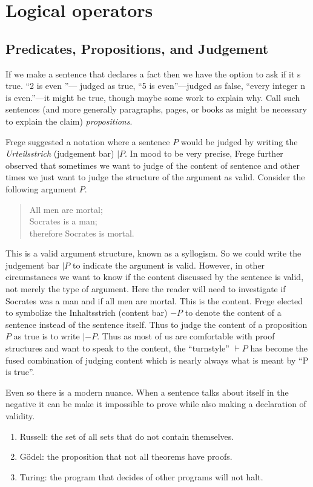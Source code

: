 
\section{Logical operators}


\subsection{Predicates, Propositions, and Judgement}
If we make a sentence that declares a fact then we have the option 
to ask if it s true.  ``2 is even ''--- judged as true, ``5 is even''---judged as false,
``every integer n is even.''---it might be true, though maybe some work to 
explain why.  Call such sentences (and more generally paragraphs, pages, or books 
as might be necessary to explain the claim) \emph{propositions}.

Frege suggested a notation where a sentence $P$ would be judged by writing the
\emph{Urteilsstrich} (judgement bar) $|P$.  In mood to be very precise,
Frege further observed that sometimes we want to judge of the content of sentence 
and other times we just want to judge the structure of the argument as valid.
Consider the following argument $P$.
\begin{quote}
    All men are mortal; \\
    Socrates is a man;\\
    therefore Socrates is mortal.
\end{quote}
This is a valid argument structure, known as a syllogism.
So we could write the judgement bar $|P$ to indicate the argument is valid.
However, in other circumstances we want to know if the content discussed by 
the sentence is valid, not merely the type of argument.  Here the reader 
will need to investigate if Socrates was a man and if all men are mortal.
This is the content.  Frege elected to symbolize the Inhaltsstrich (content bar)
$-P$ to denote the content of a sentence instead of the sentence itself.  
Thus to judge the content of a proposition $P$ as true is to write $|-P$.
Thus as most of us are comfortable with proof structures and want to speak 
to the content, the ``turnstyle'' $\vdash P$ has become the fused combination 
of judging content which is nearly always what is meant by ``P is true''.

Even so there is a modern nuance.  When a sentence talks about itself in the 
negative it can be make it impossible to prove while also making a declaration 
of validity.  
\begin{enumerate}
    \item Russell: the set of all sets that do not contain themselves.
    \item G\"odel: the proposition  that not all theorems have proofs.
    \item Turing: the program that decides of other programs will not halt.
\end{enumerate}

